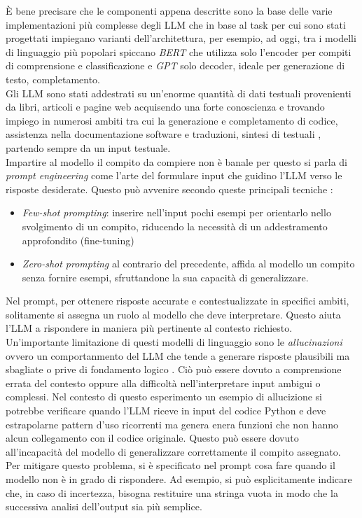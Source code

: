 \documentclass{article}
\begin{document}
È bene precisare che le componenti appena descritte sono la base delle varie implementazioni più complesse degli LLM che in base al task per cui sono stati progettati impiegano varianti dell'architettura, per esempio, ad oggi, tra i modelli di linguaggio più popolari spiccano \textit{BERT} \cite{devlin2019bertpretrainingdeepbidirectional} che utilizza solo l'encoder per compiti di comprensione e classificazione e \textit{GPT}\cite{radford2018improving} solo decoder, ideale per generazione di testo, completamento.\\
Gli LLM sono stati addestrati su un'enorme quantità di dati testuali provenienti da libri, articoli e pagine web acquisendo una forte conoscienza e trovando impiego in numerosi ambiti tra cui la generazione e completamento di codice, assistenza nella documentazione software e traduzioni, sintesi di testuali \cite{di2025use}, partendo sempre da un input testuale.\\
Impartire al modello il compito da compiere non è banale per questo si parla di \textit{prompt engineering} come l'arte del formulare input che guidino l'LLM verso le risposte desiderate. Questo può avvenire secondo queste principali tecniche \cite{di2025use}:
\begin{itemize}
    \item \textit{Few-shot prompting}: inserire nell'input pochi esempi per orientarlo nello svolgimento di un compito, riducendo la necessità di un addestramento approfondito (fine-tuning)
    \item \textit{Zero-shot prompting} al contrario del precedente, affida al modello un compito senza fornire esempi, sfruttandone la sua capacità di generalizzare.
\end{itemize}
Nel prompt, per ottenere risposte accurate e contestualizzate in specifici ambiti, solitamente si assegna un ruolo al modello che deve interpretare. Questo aiuta l'LLM a rispondere in maniera più pertinente al contesto richiesto.\\
Un'importante limitazione di questi modelli di linguaggio sono le \textit{allucinazioni} ovvero un comportanmento del LLM che tende a generare risposte plausibili ma sbagliate o prive di fondamento logico \cite{di2025use}. Ciò può essere dovuto a comprensione errata del contesto oppure alla difficoltà nell’interpretare input ambigui o complessi. Nel contesto di questo esperimento un esempio di allucizione si potrebbe verificare quando l'LLM riceve in input del codice Python e deve estrapolarne pattern d'uso ricorrenti ma genera enera funzioni che non hanno alcun collegamento con il codice originale. Questo può essere dovuto all’incapacità del modello di generalizzare correttamente il compito assegnato. Per mitigare questo problema, si è specificato nel prompt cosa fare quando il modello non è in grado di rispondere. Ad esempio, si può esplicitamente indicare che, in caso di incertezza, bisogna restituire una stringa vuota in modo che la successiva analisi dell'output sia più semplice.\\
\end{document}
